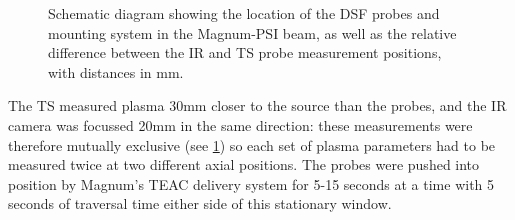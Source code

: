 \documentclass[a4paper, 12pt]{article} %
\begin{document}
	\begin{figure}
		\vspace{-5pt}
		\caption{\label{fig:schematic}Schematic diagram showing the location of the DSF probes and mounting system in the Magnum-PSI beam, as well as the relative difference between the IR and TS probe measurement positions, with distances in mm.}
		\vspace{-15pt}
	\end{figure}
	The TS measured plasma 30mm closer to the source than the probes, and the IR camera was focussed 20mm in the same direction: these measurements were therefore mutually exclusive (see \cref{fig:schematic}) so each set of plasma parameters had to be measured twice at two different axial positions.
	The probes were pushed into position by Magnum's TEAC delivery system for 5-15 seconds at a time with 5 seconds of traversal time either side of this stationary window. 
	
\end{document}
